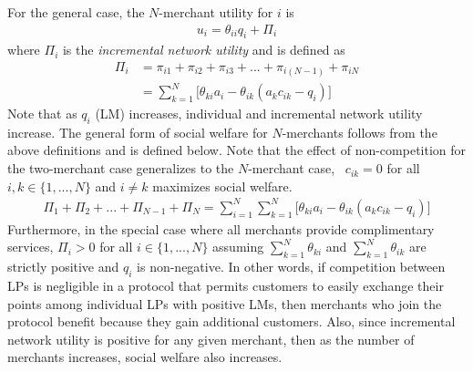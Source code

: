 For the general case, the $N$-merchant utility for $i$ is
\begin{align*}
u_i = \theta_{ii}q_i + \Pi_i
\end{align*}
%
where $\Pi_i$ is the \textit{incremental network utility} and is defined as
\begin{align*}
\Pi_i & = \pi_{i1} + \pi_{i2} + \pi_{i3} + ... + \pi_{i(N-1)} + \pi_{iN} \\
& = \sum_{k=1}^N \big[\theta_{ki}a_i - \theta_{ik}(a_k c_{ik} - q_i) \big]
\end{align*}
%
Note that as $q_i$ (LM) increases, individual and incremental network utility increase. The general form of social welfare for $N$-merchants follows from the above definitions and is defined below. Note that the effect of non-competition for the two-merchant case generalizes to the $N$-merchant case, \ie\ $c_{ik} = 0$ for all $i, k \in \{1,...,N\}$ and $i \neq k$ maximizes social welfare. 
\begin{align*}
\Pi_1+ \Pi_2 + ... + \Pi_{N-1} + \Pi_N = \sum_{i=1}^N \sum_{k=1}^N \big[\theta_{ki}a_i - \theta_{ik}(a_k c_{ik} - q_i) \big]
\end{align*}
%
Furthermore, in the special case where all merchants provide complimentary services, $\Pi_i > 0$ for all $i \in \{1,...,N\}$ assuming $\sum_{k=1}^N\theta_{ki}$ and  $\sum_{k=1}^N\theta_{ik}$ are strictly positive and $q_i$ is non-negative. In other words, if competition between LPs is negligible in a protocol that permits customers to easily exchange their points among individual LPs with positive LMs, then merchants who join the protocol benefit because they gain additional customers. Also, since incremental network utility is positive for any given merchant, then as the number of merchants increases, social welfare also increases.

